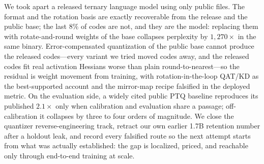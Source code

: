 We took apart a released ternary language model using only public files. The
format and the rotation basis are exactly recoverable from the release and the
public base; the last $8\%$ of codes are not, and they are the model: replacing
them with rotate-and-round weights of the base collapses perplexity by
$1{,}270\times$ in the same binary. Error-compensated quantization of the
public base cannot produce the released codes---every variant we tried moved
codes away, and the released codes fit real activation Hessians worse than
plain round-to-nearest---so the residual is weight movement from training, with
rotation-in-the-loop QAT/KD as the best-supported account and the mirror-map
recipe falsified in the deployed metric. On the evaluation side, a widely cited
public PTQ baseline reproduces its published $2.1\times$ only when calibration
and evaluation share a passage; off-calibration it collapses by three to four
orders of magnitude. We close the quantizer reverse-engineering track, retract
our own earlier 1.7B retention number after a holdout leak, and record every
falsified route so the next attempt starts from what was actually established:
the gap is localized, priced, and reachable only through end-to-end training at
scale.

